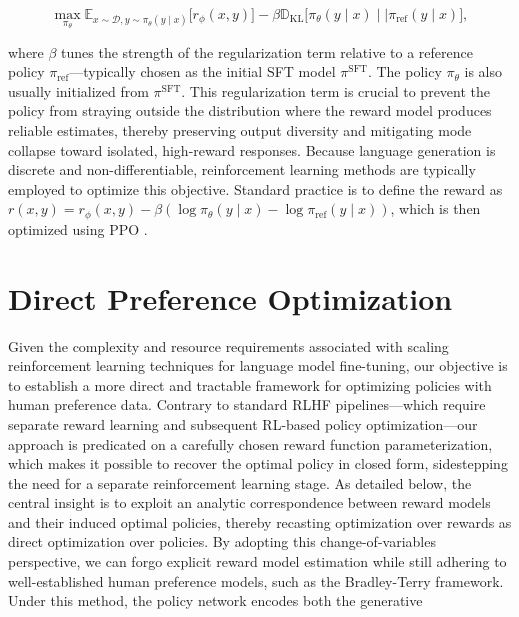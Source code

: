 \begin{equation}\label{eq:RL}
\max_{\pi_{\theta}}  \mathbb{E}_{x\sim \mathcal{D}, y\sim \pi_{\theta}(y \mid x)}\bigl[r_{\phi}(x, y)\bigr] - \beta\mathbb{D}_{\textrm{KL}}\bigl[\pi_{\theta}(y\mid x)\mid \mid \pi_\text{ref}(y\mid x)\bigr],
\end{equation}

where $\beta$ tunes the strength of the regularization term relative to a reference policy $\pi_\text{ref}$—typically chosen as the initial SFT model $\pi^\text{SFT}$. The policy $\pi_\theta$ is also usually initialized from $\pi^\text{SFT}$. This regularization term is crucial to prevent the policy from straying outside the distribution where the reward model produces reliable estimates, thereby preserving output diversity and mitigating mode collapse toward isolated, high-reward responses. Because language generation is discrete and non-differentiable, reinforcement learning methods are typically employed to optimize this objective. Standard practice \citep{ziegler2020finetuning, stiennon2022learning, bai2022training, ouyang2022training} is to define the reward as ${r(x, y) = r_{\phi}(x, y) -\beta (\log \pi_{\theta}(y\mid x) - \log \pi_\text{ref}(y\mid x))}$, which is then optimized using PPO \cite{schulman2017proximal}.

\section{Direct Preference Optimization}\label{sec:DPO}

Given the complexity and resource requirements associated with scaling reinforcement learning techniques for language model fine-tuning, our objective is to establish a more direct and tractable framework for optimizing policies with human preference data. Contrary to standard RLHF pipelines—which require separate reward learning and subsequent RL-based policy optimization—our approach is predicated on a carefully chosen reward function parameterization, which makes it possible to recover the optimal policy in closed form, sidestepping the need for a separate reinforcement learning stage. As detailed below, the central insight is to exploit an analytic correspondence between reward models and their induced optimal policies, thereby recasting optimization over rewards as direct optimization over policies. By adopting this change-of-variables perspective, we can forgo explicit reward model estimation while still adhering to well-established human preference models, such as the Bradley-Terry framework. Under this method, the policy network encodes both the generative

